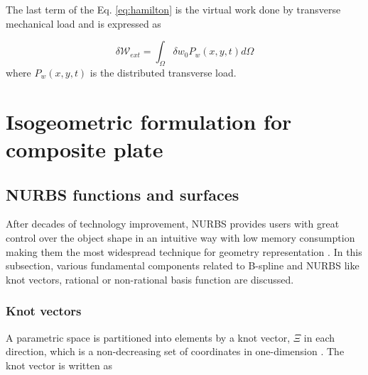 \documentclass[3p,preprint,12pt]{elsarticle}
\begin{document}


The last term of the Eq. \cref{eq:hamilton} is the virtual work done by transverse mechanical load and is expressed as

\begin{equation} \label{eq:VirtualWorkDone}
\delta \mathcal{W}_{ext}=\int_{\Omega}\delta w_{0} P_{w}\left(x, y, t \right) d\Omega
\end{equation}%
where $P_{w}\left(x, y, t \right)$ is the distributed transverse load.
\section{Isogeometric formulation for composite plate}
\subsection{NURBS functions and surfaces}
After decades of technology improvement, NURBS provides users with great control over the object shape in an intuitive way with low memory consumption making them the most widespread technique for geometry representation \cite{piegl1997monographs,rogers2001introduction}. In this subsection, various fundamental components related to B-spline and NURBS like knot vectors, rational or non-rational basis function are discussed.
\subsubsection{Knot vectors}
A parametric space is partitioned into elements by a knot vector, $\Xi$ in each direction, which is a non-decreasing set of coordinates in one-dimension \cite{piegl1997monographs,rogers2001introduction}. The knot vector is written as
\end{document}
